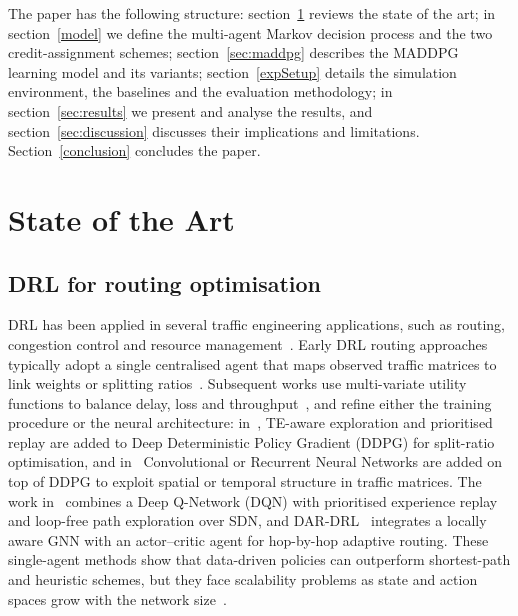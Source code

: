 \documentclass[10pt,journal,comsoc]{IEEEtran}
\begin{document}
The paper has the following structure: section~\ref{State_of_Art} reviews the state of the art; in section~\ref{model} we define the multi-agent Markov decision process and the two credit-assignment schemes; section~\ref{sec:maddpg} describes the MADDPG learning model and its variants; section~\ref{expSetup} details the simulation environment, the baselines and the evaluation methodology; in section~\ref{sec:results} we present and analyse the results, and section~\ref{sec:discussion} discusses their implications and limitations. Section~\ref{conclusion} concludes the paper.

\section{State of the Art} \label{State_of_Art}
\subsection{DRL for routing optimisation}
DRL has been applied in several traffic engineering applications, such as routing, congestion control and resource management~\cite{xiao2021leveraging,prakash2023survey}. Early DRL routing approaches typically adopt a single centralised agent that maps observed traffic matrices to link weights or splitting ratios~\cite{stampa2017deep,valadarsky2017learning}. Subsequent works use multi-variate utility functions to balance delay, loss and throughput~\cite{xiao2021leveraging,yu2018drom}, and refine either the training procedure or the neural architecture: in~\cite{xu2018experience}, TE-aware exploration and prioritised replay are added to Deep Deterministic Policy Gradient (DDPG) for split-ratio optimisation, and in~\cite{8780950} Convolutional or Recurrent Neural Networks are added on top of DDPG to exploit spatial or temporal structure in traffic matrices. The work in~\cite{huang2024intelligent} combines a Deep Q-Network (DQN) with prioritised experience replay and loop-free path exploration over SDN, and DAR-DRL~\cite{rao2024dar} integrates a locally aware GNN with an actor--critic agent for hop-by-hop adaptive routing. These single-agent methods show that data-driven policies can outperform shortest-path and heuristic schemes, but they face scalability problems as state and action spaces grow with the network size~\cite{feriani2021single,geng2020multi,guo2024distributed}.
\end{document}
